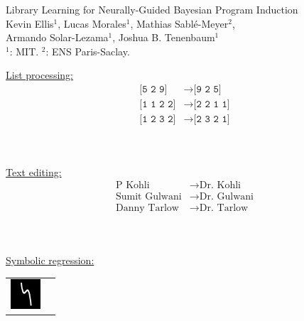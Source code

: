 \documentclass[aspectratio=169,final]{beamer}
\newcommand{\code}[1]{{\texttt{#1}}}
\begin{document}
\begin{frame}{\centering  Library Learning for Neurally-Guided Bayesian Program Induction\\
    \centering\small  Kevin Ellis$^1$, Lucas Morales$^1$, Mathias Sabl\'e-Meyer$^2$,\\ Armando Solar-Lezama$^1$, Joshua B. Tenenbaum$^1$\\
  \small   $^1$: MIT. $^2$: ENS Paris-Saclay.}

  \begin{minipage}[c]{0.3\textwidth}
\centering        \underline{List processing:}\vspace{-0.3cm}\begin{align*}
    \code{[5 2 9]}&\to\code{[9 2 5]}\\
    \code{[1 1 2 2]}&\to\code{[2 2 1 1]}\\
    \code{[1 2 3 2]}&\to\code{[2 3 2 1]}\\
    \end{align*}
  \end{minipage} $\quad$
  \begin{minipage}[c]{0.3\textwidth}
\centering            \underline{Text editing:}\vspace{-0.3cm}\begin{align*}
      \text{P Kohli}&\to\text{Dr. Kohli}\\
      \text{Sumit Gulwani}&\to\text{Dr. Gulwani}\\
      \text{Danny Tarlow}&\to\text{Dr. Tarlow}\\
      \end{align*}    
    \end{minipage} $\quad$
  \begin{minipage}[c]{0.3\textwidth}
\centering            \underline{Symbolic regression:}\\\begin{tabular}{cc}
      \includegraphics[width = 3em]{figures/functions/92.png}&

\end{tabular}
\end{minipage}
\end{frame}
\end{document}

